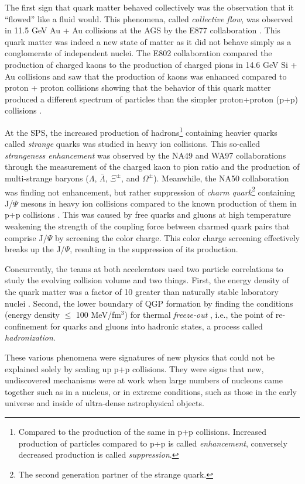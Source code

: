The first sign that quark matter behaved collectively was the observation that it ``flowed'' like a fluid would. This phenomena, called \textit{collective flow}, was observed in 11.5 GeV Au + Au collisions at the AGS by the E877 collaboration \citep{Barrette:1999rx}. This quark matter was indeed a new state of matter as it did not behave simply as a conglomerate of independent nuclei. The E802 collaboration compared the production of charged kaons to the production of charged pions in 14.6 GeV Si + Au collisions and saw that the production of kaons was enhanced compared to proton + proton collisions showing that the behavior of this quark matter produced a different spectrum of particles than the simpler proton+proton (p+p) collisions \citep{PhysRevLett.64.847}. 

At the SPS, the increased production of hadrons\footnote{Compared to the production of the same in p+p collisions. Increased production of particles compared to p+p is called \textit{enhancement}, conversely decreased production is called \textit{suppression}.} containing heavier quarks called \textit{strange} quarks was studied in heavy ion collisions. This so-called \textit{strangeness enhancement} was observed by the NA49 \citep{Hohne:1999jf} and WA97 collaborations through the measurement of the charged kaon to pion ratio and the production of multi-strange baryons ($\Lambda$, $\bar{\Lambda}$, $\Xi^{\pm}$, and $\Omega^{\pm}$). Meanwhile, the NA50 collaboration was finding not enhancement, but rather suppression of \textit{charm quark}\footnote{The second generation partner of the strange quark.} containing J/$\Psi$ mesons in heavy ion collisions compared to the known production of them in p+p collisions \citep{Abreu:2000ni}. This was caused by free quarks and gluons at high temperature weakening the strength of the coupling force between charmed quark pairs that comprise J/$\Psi$ by screening the color charge. This color charge screening effectively breaks up the J/$\Psi$, resulting in the suppression of its production.

Concurrently, the teams at both accelerators used two particle correlations to study the evolving collision volume and two things. First, the energy density of the quark matter was a factor of 10 greater than naturally stable laboratory nuclei \citep{Heinz:1999rw}. Second, the lower boundary of QGP formation by finding the conditions (energy density $\leq$ 100 MeV/fm$^{3}$) for thermal \textit{freeze-out} \citep{BraunMunzinger:1998cg}, i.e., the point of re-confinement for quarks and gluons into hadronic states, a process called \textit{hadronization}.

These various phenomena were signatures of new physics that could not be explained solely by scaling up p+p collisions. They were signs that new, undiscovered mechanisms were at work when large numbers of nucleons came together such as in a nucleus, or in extreme conditions, such as those in the early universe and inside of ultra-dense astrophysical objects. 
\pagebreak
\pagebreak
